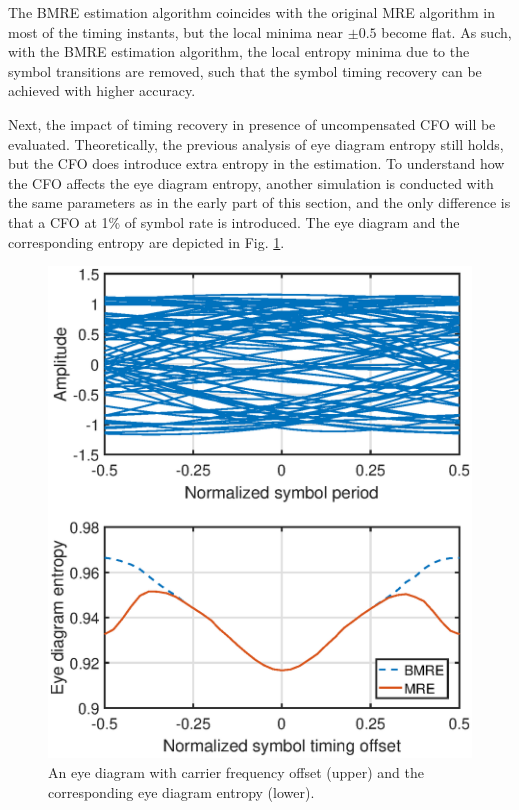 \documentclass[journal,comsoc, onecolumn, 12pt,draftclsnofoot]{IEEEtran} %
\begin{document}
The BMRE estimation algorithm coincides with the original MRE algorithm in most of the timing instants, but the local minima near $\pm0.5$ become flat.
As such, with the BMRE estimation algorithm, the local entropy minima due to the symbol transitions are removed, such that the symbol timing recovery can be achieved with higher accuracy.

Next, the impact of timing recovery in presence of uncompensated CFO will be evaluated.  
Theoretically, the previous analysis of eye diagram entropy still holds, but the CFO does introduce extra entropy in the estimation.
To understand how the CFO affects the eye diagram entropy, another simulation is conducted with the same parameters as in the early part of this section,
and the only difference is that a CFO at 1\% of symbol rate is introduced.
The eye diagram and the corresponding entropy are depicted in Fig. \ref{fig:timing_freq}.
      
\begin{figure}[ht]
\centering
\includegraphics[width=3 in]{pic/timing_freq.eps}
\caption{An eye diagram with carrier frequency offset (upper) and the corresponding eye diagram entropy (lower).}
\label{fig:timing_freq} 
\end{figure}
\end{document}
